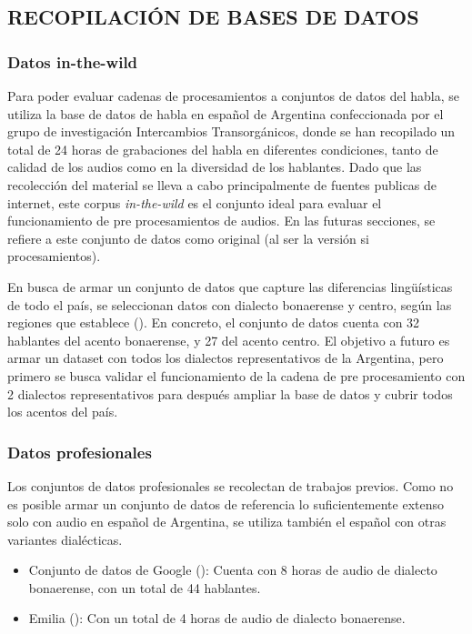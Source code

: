 \subsection{RECOPILACIÓN DE BASES DE DATOS}

\subsubsection{Datos in-the-wild}
Para poder evaluar cadenas de procesamientos a conjuntos de datos del habla, se utiliza la base de datos de habla en español de Argentina confeccionada por el grupo de investigación Intercambios Transorgánicos, donde se han recopilado un total de 24 horas de grabaciones del habla en diferentes condiciones, tanto de calidad de los audios como en la diversidad de los hablantes. Dado que las recolección del material se lleva a cabo principalmente de fuentes publicas de internet, este corpus \emph{in-the-wild} es el conjunto ideal para evaluar el funcionamiento de pre procesamientos de audios. En las futuras secciones, se refiere a este conjunto de datos como original (al ser la versión si procesamientos).

En busca de armar un conjunto de datos que capture las diferencias lingüísticas de todo el país, se seleccionan datos con dialecto bonaerense y centro, según las regiones que establece (\cite{Fontanella2004español}). En concreto, el conjunto de datos cuenta con 32 hablantes del acento bonaerense, y 27 del acento centro. El objetivo a futuro es armar un dataset con todos los dialectos representativos de la Argentina, pero primero se busca validar el funcionamiento de la cadena de pre procesamiento con 2 dialectos representativos para después ampliar la base de datos y cubrir todos los acentos del país.

\subsubsection{Datos profesionales}
Los conjuntos de datos profesionales se recolectan de trabajos previos. Como no es posible armar un conjunto de datos de referencia lo suficientemente extenso solo con audio en español de Argentina, se utiliza también el español con otras variantes dialécticas.

\begin{itemize}
    \item Conjunto de datos de Google (\cite{google-arg}): Cuenta con 8 horas de audio de dialecto bonaerense, con un total de 44 hablantes.
    \item Emilia (\cite{datset_arg}): Con un total de 4 horas de audio de dialecto bonaerense.
\end{itemize}

